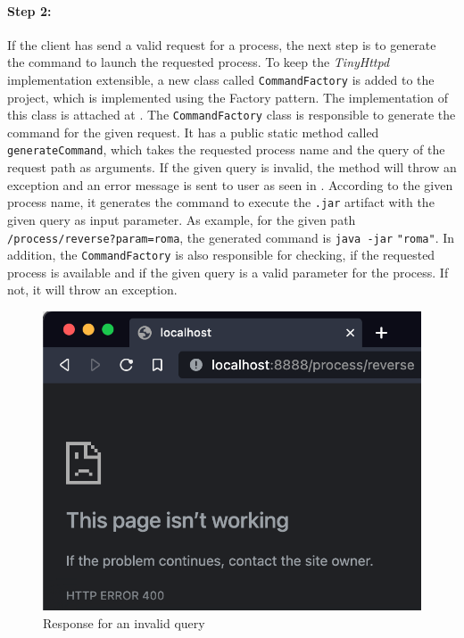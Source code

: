 \paragraph{Step 2:}
If the client has send a valid request for a process, the next step is to generate the command to launch the requested process. To keep the \textit{TinyHttpd} implementation extensible, a new class called \texttt{CommandFactory} is added to the project, which is implemented using the Factory pattern. The implementation of this class is attached at .
The \texttt{CommandFactory} class is responsible to generate the command for the given request. It has a public static method called \texttt{generateCommand}, which takes the requested process name and the query of the request path as arguments. If the given query is invalid, the method will throw an exception and an error message is sent to user as seen in .
According to the given process name, it generates the command to execute the \texttt{.jar} artifact with the given query as input parameter.
As example, for the given path \texttt{/process/reverse?param=roma}, the generated command is \texttt{java -jar}  \texttt{"roma"}. In addition, the \texttt{CommandFactory} is also responsible for checking, if the requested process is available and if the given query is a valid parameter for the process. If not, it will throw an exception.

\begin{figure}[h]
\centering
\includegraphics[scale=0.4]{images/invalidQuery}
\caption{Response for an invalid query}
\label{fig:01_part1_impl_tinyhttpd_invalidquery}
\end{figure}


